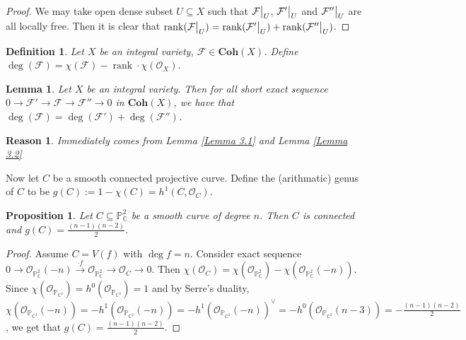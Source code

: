 \documentclass{ctexart}
\newtheorem{definition}{Definition}[section]
\newtheorem{proposition}{Proposition}[section]
\newtheorem{lemma}{Lemma}[section]
\newtheorem{reason}{Reason}[section]
\newcommand{\rank}{\operatorname{rank}}
\newcommand{\coherent}{\mathbf{Coh}}
\begin{document}
\begin{proof}
    We may take open dense subset $U \subseteq X$ such that $\mathcal{F}\big{|}_{U}$, $\mathcal{F}'\big{|}_{U}$ and $\mathcal{F}''\big{|}_{U}$ are all locally free.
    Then it is clear that $\rank (\mathcal{F}\big{|}_{U}) = \rank (\mathcal{F}'\big{|}_{U}) + \rank (\mathcal{F}''\big{|}_{U})$.
\end{proof}
\begin{definition}
    Let $X$ be an integral variety, $\mathcal{F}\in \coherent (X)$.
    Define $\deg (\mathcal{F}) = \chi(\mathcal{F}) - \rank \cdot \chi(\mathcal{O}_{X})$.
\end{definition}
\begin{lemma}
    Let $X$ be an integral variety.
    Then for all short exact sequence $0 \rightarrow \mathcal{F}' \rightarrow \mathcal{F} \rightarrow \mathcal{F}'' \rightarrow 0$ in $\coherent (X)$,
    we have that $\deg (\mathcal{F}) = \deg (\mathcal{F}') + \deg (\mathcal{F}'')$.
    \label{Lemma 3.3}
\end{lemma}
\begin{reason}
    Immediately comes from Lemma \ref{Lemma 3.1} and Lemma \ref{Lemma 3.2}
\end{reason}
Now let $C$ be a smooth connected projective curve.
Define the (arithmatic) genus of $C$ to be $g(C) := 1 - \chi(C) = h^{1}(C, \mathcal{O}_{C})$.
\begin{proposition}
    Let $C \subseteq \mathbb{P}_{\mathbb{C}}^{2}$ be a smooth curve of degree $n$.
    Then $C$ is connected and $g(C) = \frac{(n - 1)(n - 2)}{2}$.
    \label{Proposition 3.2}
\end{proposition}
\begin{proof}
    Assume $C = V(f)$ with $\deg f = n$.
    Consider exact sequence $0 \rightarrow \mathcal{O}_{\mathbb{P}_{\mathbb{C}}^{2}}(-n) \overset{\cdot f}{\rightarrow} \mathcal{O}_{\mathbb{P}_{\mathbb{C}}^{2}} \rightarrow \mathcal{O}_{C} \rightarrow 0$.
    Then $\chi(\mathcal{O}_{C}) = \chi(\mathcal{O}_{\mathbb{P}_{\mathbb{C}}^{2}}) - \chi(\mathcal{O}_{\mathbb{P}_{\mathbb{C}}^{2}}(-n))$.
    Since $\chi(\mathcal{O}_{\mathbb{P}_{\mathbb{C}^{2}}}) = h^{0}(\mathcal{O}_{\mathbb{P}_{\mathbb{C}^{2}}}) = 1$ and by Serre's duality,
    $\chi(\mathcal{O}_{\mathbb{P}_{\mathbb{C}^{2}}}(-n)) = -h^{1}(\mathcal{O}_{\mathbb{P}_{\mathbb{C}^{2}}}(-n)) = -h^{1}(\mathcal{O}_{\mathbb{P}_{\mathbb{C}^{2}}}(-n))^{\vee} = -h^{0}(\mathcal{O}_{\mathbb{P}_{\mathbb{C}^{2}}}(n - 3)) = -\frac{(n - 1)(n - 2)}{2}$,
    we get that $g(C) = \frac{(n - 1)(n - 2)}{2}$.
\end{proof}
\end{document}
